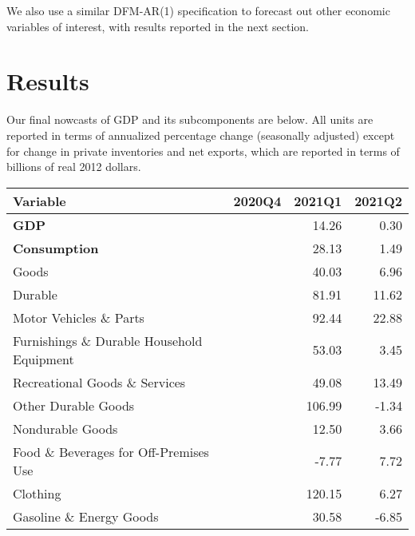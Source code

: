 \documentclass[11pt, letterpaper]{article}\usepackage[]{graphicx}\usepackage[]{color}
\begin{document}
We also use a similar DFM-AR(1) specification to forecast out other economic variables of interest, with results reported in the next section.


\section{Results}
Our final nowcasts of GDP and its subcomponents are below. All units are reported in terms of annualized percentage change (seasonally adjusted) except for change in private inventories and net exports, which are reported in terms of billions of real 2012 dollars.
\begin{table}[H]
\centering
\begingroup\fontsize{10pt}{12pt}\selectfont
\begin{tabular}{lrrr}
  \hline
Variable & 2020Q4 & 2021Q1 & 2021Q2 \\ 
  \hline
\hspace{0mm} \textbf{GDP} &  & 14.26 & 0.30 \\ 
  \hspace{0mm} \textbf{Consumption} &  & 28.13 & 1.49 \\ 
  \hspace{8mm}  Goods &  & 40.03 & 6.96 \\ 
  \hspace{16mm}  Durable &  & 81.91 & 11.62 \\ 
  \hspace{24mm}  Motor Vehicles \& Parts &  & 92.44 & 22.88 \\ 
  \hspace{24mm}  Furnishings \& Durable Household Equipment &  & 53.03 & 3.45 \\ 
  \hspace{24mm}  Recreational Goods \& Services &  & 49.08 & 13.49 \\ 
  \hspace{24mm}  Other Durable Goods &  & 106.99 & -1.34 \\ 
  \hspace{16mm}  Nondurable Goods &  & 12.50 & 3.66 \\ 
  \hspace{24mm}  Food \& Beverages for Off-Premises Use &  & -7.77 & 7.72 \\ 
  \hspace{24mm}  Clothing &  & 120.15 & 6.27 \\ 
  \hspace{24mm}  Gasoline \& Energy Goods &  & 30.58 & -6.85 \\ 

\end{tabular}
\end{table}
\end{document}

